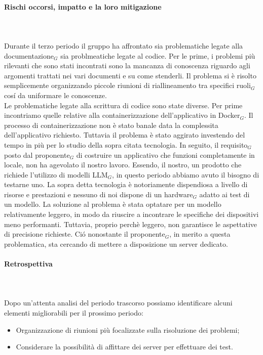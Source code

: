 \paragraph{Rischi occorsi, impatto e la loro mitigazione} \hspace{1cm} 
\\ \hspace{1cm} \\
Durante il terzo periodo il gruppo ha affrontato sia problematiche legate alla documentazione$_G$ sia problmeatiche legate al codice. Per le prime, i problemi più rilevanti che sono stati incontrati sono la mancanza di conoscenza riguardo agli argomenti trattati nei vari documenti e su come stenderli. Il problema si è risolto semplicemente organizzando piccole riunioni di riallineamento tra specifici ruoli$_G$ cosí da uniformare le conoscenze. \\
Le problematiche legate alla scrittura di codice sono state diverse. Per prime incontriamo quelle relative alla containerizzazione dell'applicativo in Docker$_G$. Il processo di containerizzazione non è stato banale data la complessita dell'applicativo richiesto. Tuttavia il problema è stato aggirato investendo del tempo in più per lo studio della sopra citata tecnologia. In seguito, il requisito$_G$ posto dal proponente$_G$ di costruire un applicativo che funzioni completamente in locale, non ha agevolato il nostro lavoro. Essendo, il nostro, un prodotto che richiede l'utilizzo di modelli LLM$_G$, in questo periodo abbiamo avuto il bisogno di testarne uno. La sopra detta tecnologia è notoriamente dispendiosa a livello di risorse e prestazioni e nessuno di noi dispone di un hardware$_G$ adatto ai test di un modello. La soluzione al problema è stata optatare per un modello relativamente leggero, in modo da riuscire a incontrare le specifiche dei dispositivi meno performanti. Tuttavia, proprio perchè leggero, non garantisce le aspettative di precisione richieste. Ció nonostante il proponente$_G$, in merito a questa problematica, sta cercando di mettere a disposizione un server dedicato.

\paragraph{Retrospettiva} \hspace{1cm} 
\\ \hspace{1cm} \\
Dopo un'attenta analisi del periodo trascorso possiamo identificare alcuni elementi migliorabili per il prossimo periodo:
\begin{itemize}
    \item Organizzazione di riunioni più focalizzate sulla risoluzione dei problemi;
    \item Considerare la possibilità di affittare dei server per effettuare dei test.
\end{itemize}

